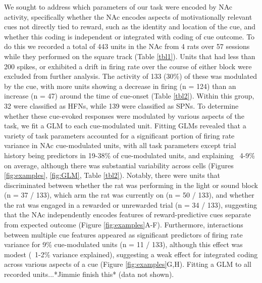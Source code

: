 \documentclass[11pt]{article}
\begin{document}
We sought to address which parameters of our task were encoded by NAc activity, specifically whether the NAc encodes aspects of motivationally relevant cues not directly tied to reward, such as the identity and location of the cue, and whether this coding is independent or integrated with coding of cue outcome. To do this we recorded a total of 443 units  in the NAc from 4 rats over 57 sessions while they performed on the square track (Table \ref{tbl1}). Units that had less than 200 spikes, or exhibited a drift in firing rate over the course of either block were excluded from further analysis. The activity of 133 (30\%) of these was modulated by the cue, with more units showing a decrease in firing (n = 124) than an increase (n = 47) around the time of cue-onset (Table \ref{tbl2}). Within this group, 32 were classified as HFNs, while 139 were classified as SPNs. To determine whether these cue-evoked responses were modulated by various aspects of the task, we fit a GLM to each cue-modulated unit. Fitting GLMs revealed that a variety of task parameters accounted for a significant portion of firing rate variance in NAc cue-modulated units, with all task parameters except trial history being predictors in 19-38\% of cue-modulated units, and explaining ~4-9\% on average, although there was substantial variability across cells (Figures \ref{fig:examples}, \ref{fig:GLM}, Table \ref{tbl2}). Notably, there were units that discriminated between whether the rat was performing in the light or sound block (n = 37 / 133), which arm the rat was currently on (n = 50 / 133), and whether the rat was engaged in a rewarded or unrewarded trial (n = 34 / 133), suggesting that the NAc independently encodes features of reward-predictive cues separate from expected outcome (Figure \ref{fig:examples}A-F). Furthermore, interactions between multiple cue features appeared as significant predictors of firing rate variance for 9\% cue-modulated units (n = 11 / 133), although this effect was modest (~1-2\% variance explained), suggesting a weak effect for integrated coding across various aspects of a cue (Figure \ref{fig:examples}G,H). Fitting a GLM to all recorded units...*Jimmie finish this* (data not shown).
\end{document}

